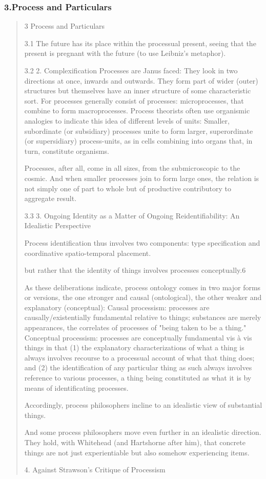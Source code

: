 \documentclass[a4paper]{Thesis}
\begin{document}
\subsubsection{3.Process and Particulars}
\begin{quotation}
	3
	Process and Particulars
	
	3.1
	The future has its place within the processual present, seeing that the present
	is pregnant with the future (to use Leibniz's metaphor).
	
	3.2
	2. Complexification
	Processes are Janus faced: They look in two directions at once, inwards and outwards.
	They form part of wider (outer) structures but themselves have an inner structure of
	some characteristic sort. For processes generally consist of processes: microprocesses,
	that combine to form macroprocesses. Process theorists often use organismic analogies
	to indicate this idea of different levels of units: Smaller, subordinate (or subsidiary)
	processes unite to form larger, superordinate (or supersidiary) process-units, as in cells
	combining into organs that, in turn, constitute organisms.
	
	Processes, after all, come in all sizes, from the submicroscopic to the cosmic. And when
	smaller processes join to form large ones, the relation is not simply one of part to whole
	but of productive contributory to aggregate result.
	
	3.3
	3. Ongoing Identity as a Matter of Ongoing Reidentifiability: An Idealistic Perspective
	
	Process identification thus involves two components: type
	specification and coordinative spatio-temporal placement.
	
	but rather that the identity of things involves
	processes conceptually.6
	
	As these deliberations indicate, process ontology comes in two major forms or versions,
	the one stronger and causal (ontological), the other weaker and explanatory
	(conceptual):
	Causal processism: processes are causally/existentially fundamental
	relative to things; substances are merely appearances, the correlates of
	processes of "being taken to be a thing."
	Conceptual processism: processes are conceptually fundamental vis à vis
	things in that (1) the explanatory characterizations of what a thing is
	always involves recourse to a processual account of what that thing
	does; and (2) the identification of any particular thing as such always
	involves reference to various processes, a thing being constituted as
	what it is by means of identificating processes.
	
	Accordingly, process philosophers incline to an idealistic view of substantial
	things.
	
	And some process philosophers move even further in an idealistic direction. They hold,
	with Whitehead (and Hartshorne after him), that concrete things are not just
	experientiable but also somehow experiencing items.
	
	4. Against Strawson's Critique of Processism
\end{quotation}
\end{document}
